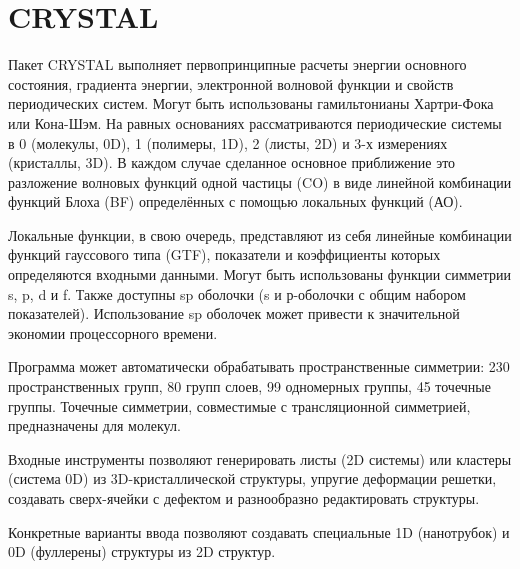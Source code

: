 \section{CRYSTAL}
Пакет CRYSTAL выполняет первопринципные расчеты энергии основного состояния, градиента энергии, электронной волновой функции и свойств периодических систем. Могут быть использованы гамильтонианы Хартри-Фока или Кона-Шэм. На равных основаниях рассматриваются периодические системы в 0 (молекулы, 0D), 1 (полимеры, 1D), 2 (листы, 2D) и 3-х измерениях (кристаллы, 3D). В каждом случае сделанное основное приближение это разложение волновых функций одной частицы (CO) в виде линейной комбинации функций Блоха (BF) определённых с помощью локальных функций (АО).

Локальные функции, в свою очередь, представляют из себя линейные комбинации функций гауссового типа (GTF), показатели и коэффициенты которых определяются входными данными. Могут быть использованы функции симметрии s, p, d и f. Также доступны sp оболочки (s и р-оболочки с общим набором показателей). Использование sp оболочек может привести к значительной экономии процессорного времени.

Программа может автоматически обрабатывать пространственные симметрии: 230 пространственных групп, 80 групп слоев, 99 одномерных группы, 45 точечные группы. Точечные симметрии, совместимые с трансляционной симметрией, предназначены для молекул.

Входные инструменты позволяют генерировать листы (2D системы) или кластеры (система 0D) из 3D-кристаллической структуры, упругие деформации решетки, создавать сверх-ячейки с дефектом и разнообразно редактировать структуры.

Конкретные варианты ввода позволяют создавать специальные 1D (нанотрубок) и 0D (фуллерены) структуры из 2D структур.\cite{crystal}